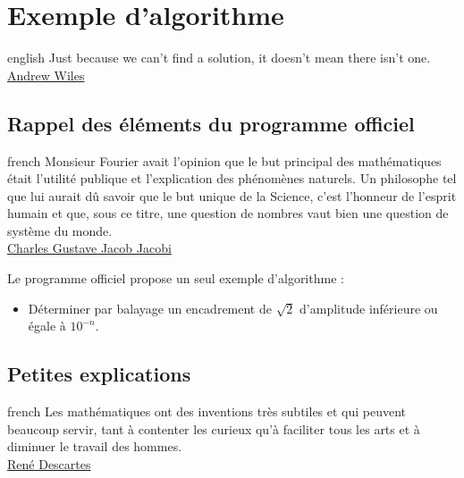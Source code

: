 \documentclass[a4paper, 11pt, twoside]{article}
\begin{document}
\section{Exemple d'algorithme}
\label{sec:orgd715be4}

\begin{foreigndisplayquote}{english}
Just because we can’t find a solution, it doesn’t mean there isn’t
one.\\

\href{https://en.wikipedia.org/wiki/Andrew\_Wiles}{Andrew Wiles}
\end{foreigndisplayquote}

\startcontents[level-1]

\subsection{Rappel des éléments du programme officiel}
\label{sec:org91773a3}

\begin{foreigndisplayquote}{french}
Monsieur Fourier avait l'opinion que le but principal des
mathématiques était l'utilité publique et l'explication des
phénomènes naturels. Un philosophe tel que lui aurait dû savoir que
le but unique de la Science, c'est l'honneur de l'esprit humain et
que, sous ce titre, une question de nombres vaut bien une question
de système du monde.\\

\href{https://fr.wikipedia.org/wiki/Charles\_Gustave\_Jacob\_Jacobi}{Charles Gustave Jacob Jacobi}
\end{foreigndisplayquote}

\startcontents[level-2]

Le programme officiel propose un seul exemple d'algorithme :
\begin{itemize}
\item Déterminer par balayage un encadrement de \(\sqrt{2}\) d'amplitude
inférieure ou égale à \(10^{-n}\).
\end{itemize}
\stopcontents[level-2]

\subsection{Petites explications}
\label{sec:org9621c0a}

\begin{foreigndisplayquote}{french}
Les mathématiques ont des inventions très subtiles et qui peuvent
beaucoup servir, tant à contenter les curieux qu'à faciliter tous
les arts et à diminuer le travail des hommes. \\

\href{https://fr.wikipedia.org/wiki/Ren\%C3\%A9\_Descartes}{René Descartes}
\end{foreigndisplayquote}
\end{document}
